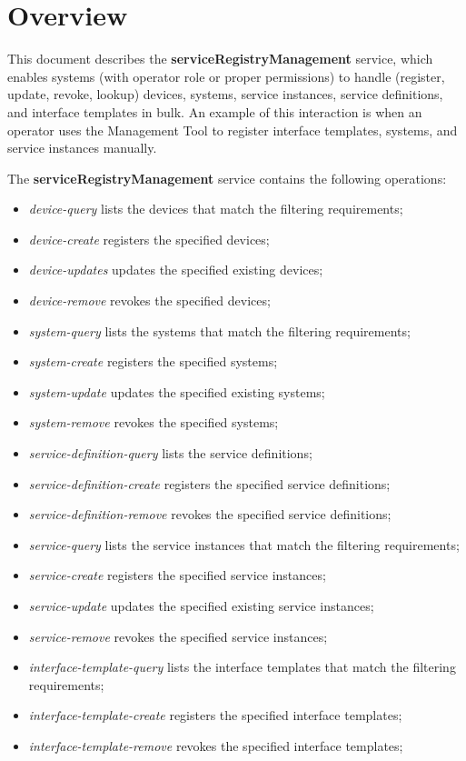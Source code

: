 \documentclass[a4paper]{arrowhead}
\begin{document}
\section{Overview}
\label{sec:overview}
This document describes the \textbf{serviceRegistryManagement} service, which enables systems (with operator role or proper permissions) to handle (register, update, revoke, lookup) devices, systems, service instances, service definitions, and interface templates in bulk. An example of this interaction is when an operator uses the Management Tool to register interface templates, systems, and service instances manually.

The \textbf{serviceRegistryManagement} service contains the following operations:

\begin{itemize}
    \item \textit{device-query} lists the devices that match the filtering requirements;
    \item \textit{device-create} registers the specified devices;
    \item \textit{device-updates} updates the specified existing devices;
    \item \textit{device-remove} revokes the specified devices;
    \item \textit{system-query} lists the systems that match the filtering requirements;
    \item \textit{system-create} registers the specified systems;
    \item \textit{system-update} updates the specified existing systems;
    \item \textit{system-remove} revokes the specified systems;
    \item \textit{service-definition-query} lists the service definitions;
    \item \textit{service-definition-create} registers the specified service definitions;
    \item \textit{service-definition-remove} revokes the specified service definitions;
    \item \textit{service-query} lists the service instances that match the filtering requirements;
    \item \textit{service-create} registers the specified service instances;
    \item \textit{service-update} updates the specified existing service instances;
    \item \textit{service-remove} revokes the specified service instances;
    \item \textit{interface-template-query} lists the interface templates that match the filtering requirements;
    \item \textit{interface-template-create} registers the specified interface templates;
    \item \textit{interface-template-remove} revokes the specified interface templates;
    
\end{itemize}
\end{document}
